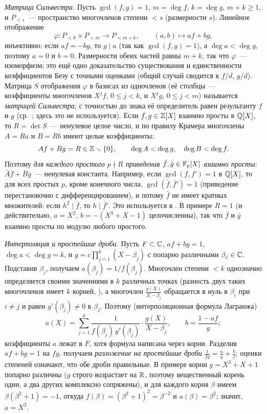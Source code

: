 \begin{aside}
\emph{Матрица Сильвестра.} Пусть $\gcd(f,g)=1$, $m=\deg f$, $k=\deg g$, $m+k\ge1$, и $P_{<s}$~--- пространство
многочленов степени $<s$ (размерности $s$). Линейное отображение
\[
\varphi\colon P_{<k}\times P_{<m}\to P_{<m+k},\qquad (a,b)\mapsto af+bg,
\]
инъективно: если $af=-bg$, то $g\mid a$ (так как $\gcd(f,g)=1$), а $\deg a<\deg g$, поэтому $a=0$ и $b=0$. Размерности
обеих частей равны $m+k$, так что $\varphi$~--- изоморфизм; это ещё одно доказательство существования и единственности
коэффициентов Безу с точными оценками (общий случай сводится к $f/d$, $g/d$). Матрица $S$ отображения $\varphi$ в базисах из
одночленов (её столбцы~--- коэффициенты многочленов $X^jf$, $0\le j<k$, и $X^jg$, $0\le j<m$) называется
\emph{матрицей Сильвестра}; с точностью до знака её определитель равен результанту $f$ и $g$ (ср.\ ; здесь это не
используется). Если $f,g\in\mathbb Z[X]$ взаимно просты в $\mathbb Q[X]$, то $R=\det S$~--- ненулевое целое число, и по правилу Крамера
многочлены $A=Ra$ и $B=Rb$ имеют целые коэффициенты:
\[
Af+Bg=R\in\mathbb Z\smallsetminus\{0\},\qquad \deg A<\deg g,\quad \deg B<\deg f .
\]
Поэтому \emph{для каждого простого $p\nmid R$ приведения $\bar f,\bar g\in\mathbb F_p[X]$ взаимно просты}: $\bar A\bar f+\bar B\bar g$~---
ненулевая константа. Например, если $\gcd(f,f')=1$ в $\mathbb Q[X]$, то для всех простых $p$, кроме конечного числа,
$\gcd(\bar f,\bar f')=1$ (приведение перестановочно с дифференцированием), и потому $\bar f$ не имеет кратных множителей:
если $h^2\mid\bar f$, то $h\mid\bar f'$. Это используется в . В примере  $R=1$ (и действительно,
$a=X^2$, $b=-(X^3+X-1)$ целочисленны), так что $\bar f$ и $\bar g$ взаимно просты по модулю любого простого.

\emph{Интерполяция и простейшие дроби.} Пусть $F\subset\mathbb C$, $af+bg=1$, $\deg a<\deg g=k$, и
$g=c\prod_{j=1}^k(X-\beta_j)$ с попарно различными $\beta_j\in\mathbb C$. Подставив $\beta_j$, получаем
$a(\beta_j)=1/f(\beta_j)$. Многочлен степени $<k$ однозначно определяется своими значениями в $k$ различных точках
(разность двух таких многочленов имеет $k$ корней, ), а многочлен $\frac{g(X)}{X-\beta_j}$ обращается в нуль в
$\beta_i$ при $i\ne j$ и равен $g'(\beta_j)\ne0$ в $\beta_j$. Поэтому (интерполяционная формула Лагранжа)
\[
a(X)=\sum_{j=1}^k\frac1{f(\beta_j)\,g'(\beta_j)}\cdot\frac{g(X)}{X-\beta_j},\qquad b=\frac{1-af}g;
\]
коэффициенты $a$ лежат в $F$, хотя формула написана через корни. Разделив $af+bg=1$ на $fg$, получаем
\emph{разложение на простейшие дроби} $\frac1{fg}=\frac ag+\frac bf$; оценки степеней означают, что обе дроби правильные.
В примере  корни $g=X^3+X+1$ попарно различны ($g$ строго возрастает на $\mathbb R$, поэтому вещественный корень один,
а два других комплексно сопряжены), и для каждого корня $\beta$ имеем $\beta(\beta^2+1)=-1$, откуда
$f(\beta)=(\beta^2+1)^2=\beta^{-2}$ и $a(\beta)=\beta^2$; значит, $a=X^2$.
\end{aside}

